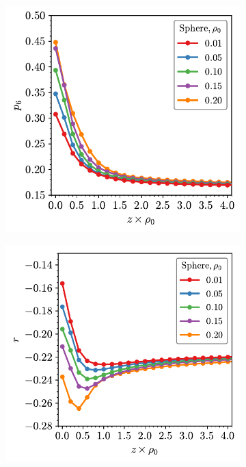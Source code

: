\begin{figure}[bt]

	\begin{subfigure}[b]{0.45\textwidth}
         \centering
         \includegraphics[width=\textwidth]{./figures/quasi2d/p6_z_3d_sphere.pdf}
         \caption{}
         \label{fig:pra}
     \end{subfigure}
     \hfill
     \begin{subfigure}[b]{0.46\textwidth}
         \centering
         \includegraphics[width=\textwidth]{./figures/quasi2d/r_z_3d_sphere.pdf}
         \caption{}
         \label{fig:prb}
     \end{subfigure}
     \hfill
     

\end{figure}
